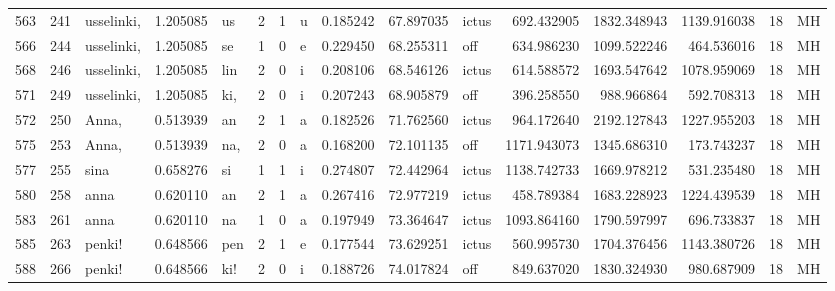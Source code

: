 \begin{tabular}{lrlrllllrrlrrrll}
563  &         241 &       usselinki, &  1.205085 &      us &        2 &      1 &       u &      0.185242 &     67.897035 &  ictus &   692.432905 &  1832.348943 &  1139.916038 &     18 &        MH \\
566  &         244 &       usselinki, &  1.205085 &      se &        1 &      0 &       e &      0.229450 &     68.255311 &    off &   634.986230 &  1099.522246 &   464.536016 &     18 &        MH \\
568  &         246 &       usselinki, &  1.205085 &     lin &        2 &      0 &       i &      0.208106 &     68.546126 &  ictus &   614.588572 &  1693.547642 &  1078.959069 &     18 &        MH \\
571  &         249 &       usselinki, &  1.205085 &     ki, &        2 &      0 &       i &      0.207243 &     68.905879 &    off &   396.258550 &   988.966864 &   592.708313 &     18 &        MH \\
572  &         250 &            Anna, &  0.513939 &      an &        2 &      1 &       a &      0.182526 &     71.762560 &  ictus &   964.172640 &  2192.127843 &  1227.955203 &     18 &        MH \\
575  &         253 &            Anna, &  0.513939 &     na, &        2 &      0 &       a &      0.168200 &     72.101135 &    off &  1171.943073 &  1345.686310 &   173.743237 &     18 &        MH \\
577  &         255 &             sina &  0.658276 &      si &        1 &      1 &       i &      0.274807 &     72.442964 &  ictus &  1138.742733 &  1669.978212 &   531.235480 &     18 &        MH \\
580  &         258 &             anna &  0.620110 &      an &        2 &      1 &       a &      0.267416 &     72.977219 &  ictus &   458.789384 &  1683.228923 &  1224.439539 &     18 &        MH \\
583  &         261 &             anna &  0.620110 &      na &        1 &      0 &       a &      0.197949 &     73.364647 &  ictus &  1093.864160 &  1790.597997 &   696.733837 &     18 &        MH \\
585  &         263 &           penki! &  0.648566 &     pen &        2 &      1 &       e &      0.177544 &     73.629251 &  ictus &   560.995730 &  1704.376456 &  1143.380726 &     18 &        MH \\
588  &         266 &           penki! &  0.648566 &     ki! &        2 &      0 &       i &      0.188726 &     74.017824 &    off &   849.637020 &  1830.324930 &   980.687909 &     18 &        MH \\

\end{tabular}
